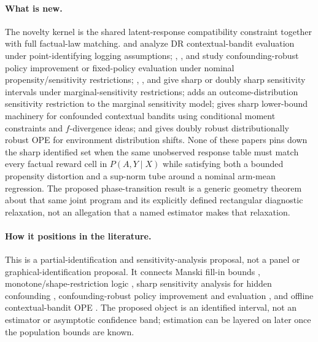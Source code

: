 \documentclass[11pt]{article}
\theoremstyle{definition}
\theoremstyle{plain}
\theoremstyle{remark}
\begin{document}
\paragraph{What is new.}
The novelty kernel is the shared latent-response compatibility constraint together with full factual-law matching. \citet{DudikLangfordLi2011} and \citet{WangAgarwalDudik2017} analyze DR contextual-bandit evaluation under point-identifying logging assumptions; \citet{KallusZhou2018}, \citet{KallusZhou2020}, and \citet{KallusZhou2021} study confounding-robust policy improvement or fixed-policy evaluation under nominal propensity/sensitivity restrictions; \citet{DornGuo2023}, \citet{DornGuoKallus2025}, and \citet{HessFrauenMelnychukFeuerriegel2026} give sharp or doubly sharp sensitivity intervals under marginal-sensitivity restrictions; \citet{ZhangXuTan2025} adds an outcome-distribution sensitivity restriction to the marginal sensitivity model; \citet{IshikawaHe2023} gives sharp lower-bound machinery for confounded contextual bandits using conditional moment constraints and $f$-divergence ideas; and \citet{KallusMaoWangZhou2022} gives doubly robust distributionally robust OPE for environment distribution shifts. None of these papers pins down the sharp identified set when the same unobserved response table must match every factual reward cell in $P(A,Y\mid X)$ while satisfying both a bounded propensity distortion and a sup-norm tube around a nominal arm-mean regression. The proposed phase-transition result is a generic geometry theorem about that same joint program and its explicitly defined rectangular diagnostic relaxation, not an allegation that a named estimator makes that relaxation.

\paragraph{How it positions in the literature.}
This is a partial-identification and sensitivity-analysis proposal, not a panel or graphical-identification proposal. It connects Manski fill-in bounds \citep{Manski1990}, monotone/shape-restriction logic \citep{ManskiPepper2000}, sharp sensitivity analysis for hidden confounding \citep{DornGuo2023,DornGuoKallus2025,HessFrauenMelnychukFeuerriegel2026,ZhangXuTan2025}, confounding-robust policy improvement and evaluation \citep{KallusZhou2018,KallusZhou2020,KallusZhou2021}, and offline contextual-bandit OPE \citep{DudikLangfordLi2011,WangAgarwalDudik2017,SiZhangZhouBlanchet2020,KallusMaoWangZhou2022}. The proposed object is an identified interval, not an estimator or asymptotic confidence band; estimation can be layered on later once the population bounds are known.
\end{document}
